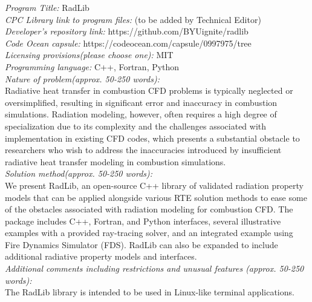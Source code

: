 \documentclass[preprint,12pt]{elsarticle}
\begin{document}
    \begin{small}
        \noindent
        {\em Program Title:} RadLib                                         \\
        {\em CPC Library link to program files:} (to be added by Technical Editor) \\
        {\em Developer's repository link:} https://github.com/BYUignite/radlib \\
        {\em Code Ocean capsule:} https://codeocean.com/capsule/0997975/tree \\
        {\em Licensing provisions(please choose one):} MIT \\
        {\em Programming language:} C++, Fortran, Python \\
        {\em Nature of problem(approx. 50-250 words):} \\
        Radiative heat transfer in combustion CFD problems is typically neglected or oversimplified, resulting in
        significant error and inaccuracy in combustion simulations. Radiation modeling, however, often requires a
        high degree of specialization due to its complexity and the challenges associated with implementation in
        existing CFD codes, which presents a substantial obstacle to researchers who wish to address the inaccuracies
        introduced by insufficient radiative heat transfer modeling in combustion simulations. \\
        {\em Solution method(approx. 50-250 words):}\\
        We present RadLib, an open-source C++ library of validated radiation property models that can be applied
        alongside various RTE solution methods to ease some of the obstacles associated with radiation modeling for
        combustion CFD. The package includes C++, Fortran, and Python interfaces, several illustrative examples with
        a provided ray-tracing solver, and an integrated example using Fire Dynamics Simulator (FDS). RadLib can also
        be expanded to include additional radiative property models and interfaces. \\
        {\em Additional comments including restrictions and unusual features (approx. 50-250 words):}\\
        The RadLib library is intended to be used in Linux-like terminal applications.
        \\

    \end{small}

\end{document}
